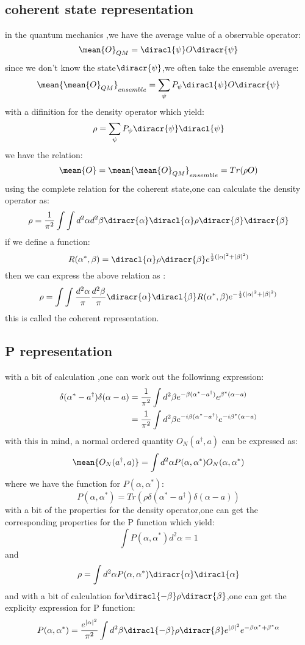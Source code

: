 \subsection{coherent state representation}
in the quantum mechanics ,we have the average value of a observable operator:
\[\mean{O}_{QM}=\diracl{\psi}O\diracr{\psi}\]
since we don't know the state$\diracr{\psi}$,we often take the ensemble average:
\[\mean{\mean{O}_{QM}}_{ensemble}=\sum_{\psi}P_{\psi}\diracl{\psi}O\diracr{\psi}\]
with a difinition for the density operator which yield:
\[\rho=\sum_{\psi}P_{\psi}\diracr{\psi}\diracl{\psi}\]
we have the relation:
\[\mean{O}=\mean{\mean{O}_{QM}}_{ensemble}=Tr(\rho O)\]
using the complete relation for the coherent state,one can calculate the density operator as:
\[\rho=\frac{1}{\pi^2}\int\int d^2\alpha d^2\beta \diracr{\alpha}\diracl{\alpha}\rho\diracr{\beta}\diracr{\beta}\]
if we define a function:
\[R(\alpha^*,\beta)=\diracl{\alpha}\rho\diracr{\beta}e^{\frac{1}{2}(|\alpha|^2+|\beta|^2)}\]
then we can express the above relation as :
\begin{equation}
\rho=\int\int\frac{d^2\alpha}{\pi}\frac{d^2\beta}{\pi}\diracr{\alpha}\diracl{\beta}R(\alpha^*,\beta)e^{-\frac{1}{2}(|\alpha|^2+|\beta|^2)}
\end{equation}
this is called the coherent representation.\par

\subsection{P representation}
with a bit of calculation ,one can work out the followinng expression:
\begin{align}
\notag \delta(\alpha^*-a^\dagger)\delta(\alpha-a)&=\frac{1}{\pi^2}\int d^2\beta e^{-\beta(\alpha^*-a^\dagger)}e^{\beta^*(\alpha-a)}\\
&=\frac{1}{\pi^2}\int d^2\beta e^{-i\beta(\alpha^*-a^\dagger)}e^{-i\beta^*(\alpha-a)}
\end{align}
with this in mind, a normal ordered quantity $O_N(a^\dagger,a)$ can be expressed as:
\[\mean{O_N(a^\dagger,a)}=\int d^2\alpha P(\alpha,\alpha^*) O_N(\alpha,\alpha^*)\]
where we have the function for $P(\alpha,\alpha^*)$:
\begin{equation}
P(\alpha,\alpha^*)=Tr(\rho\delta(\alpha^*-a^\dagger)\delta(\alpha-a))
\end{equation}
with a bit of the properties for the density operator,one can get the corresponding properties for the P function which yield:
\[\int P(\alpha,\alpha^*)d^2\alpha=1\]
and 
\[\rho=\int d^2\alpha P(\alpha,\alpha^*)\diracr{\alpha}\diracl{\alpha}\]
and with a bit of calculation for$\diracl{-\beta}\rho\diracr{\beta}$,one can get the explicity expression for P function:
\begin{equation}
P(\alpha,\alpha^*)=\frac{e^{|\alpha|^2}}{\pi^2}\int d^2\beta\diracl{-\beta}\rho\diracr{\beta}e^{|\beta|^2}e^{-\beta\alpha^*+\beta^*\alpha}
\end{equation}
